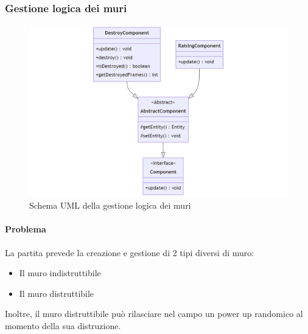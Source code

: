 \documentclass[a4paper,12pt]{report}
\begin{document}
\subsubsection{Gestione logica dei muri}

\begin{figure}[H]
    \centering{}
    \includegraphics[width=1\textwidth]{img/UMLGestioneMuri.png}
    \caption{Schema UML della gestione logica dei muri}
    \label{img:command}
\end{figure}

\paragraph{Problema} La partita prevede la creazione e gestione di 2 tipi diversi di muro:
\begin{itemize}
    \item Il muro indistruttibile
    \item Il muro distruttibile
\end{itemize}
Inoltre, il muro distruttibile può rilasciare nel campo un power up randomico al momento della sua distruzione.
\end{document}
